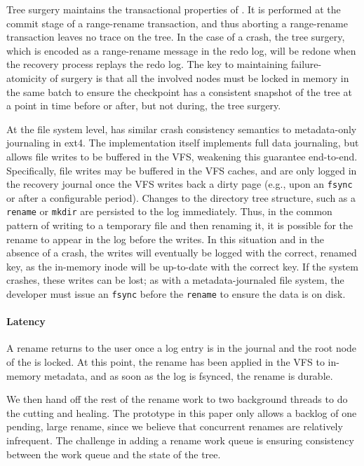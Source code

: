 Tree surgery maintains the transactional properties of \betrfs.
It is performed at the commit stage of a range-rename transaction,
and thus aborting a range-rename transaction leaves no trace on the tree.
In the case of a crash, the tree surgery, which is encoded as a range-rename
message in the redo log, will be redone when the recovery process replays the
redo log.
The key to maintaining failure-atomicity of surgery is that all the involved
nodes must be locked in memory in the same batch to ensure the checkpoint has
a consistent snapshot of the tree at a point in time before or after,
but not during, the tree surgery.

At the file system level, \betrfs has similar crash consistency semantics to
metadata-only journaling in ext4.
The \bet implementation itself implements full data journaling, but \betrfs
allows file writes to be buffered in the VFS, weakening this guarantee
end-to-end.
Specifically, file writes may be buffered in the VFS caches, and are only logged
in the recovery journal once the VFS writes back a dirty page (e.g., upon an
{\tt fsync} or after a configurable period).
Changes to the directory tree structure, such as a {\tt rename} or {\tt mkdir}
are persisted to the log immediately.
Thus, in the common pattern of writing to a temporary file and then renaming it,
it is possible for the rename to appear in the log before the writes.
In this situation and in the absence of a crash, the writes will eventually be
logged with the correct, renamed key, as the in-memory inode will be up-to-date
with the correct \bet key.
If the system crashes, these writes can be lost; as with a metadata-journaled
file system, the developer must issue an {\tt fsync} before the {\tt rename} to
ensure the data is on disk.

\paragraph{Latency} A rename returns to the user once a log entry is in the
journal and the root node of the \bet is locked.
At this point, the rename has been applied in the VFS to in-memory metadata,
and as soon as the log is fsynced, the rename is durable.

We then hand off the rest of the rename work to two background threads
to do the cutting and healing.
The prototype in this paper only allows a backlog of one pending, large rename,
since we believe that concurrent renames are relatively infrequent.
The challenge in adding a rename work queue is ensuring consistency between the
work queue and the state of the tree.

